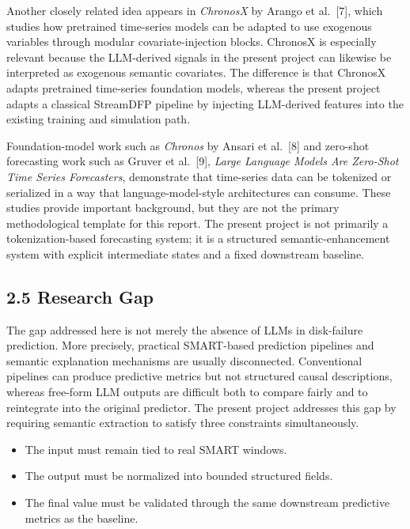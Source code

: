 \documentclass[
  11pt,
  a4paper]{article}
\providecommand{\tightlist}{%
  \setlength{\itemsep}{0pt}\setlength{\parskip}{0pt}}
\begin{document}
Another closely related idea appears in \emph{ChronosX} by Arango et
al.~{[}7{]}, which studies how pretrained time-series models can be
adapted to use exogenous variables through modular covariate-injection
blocks. ChronosX is especially relevant because the LLM-derived signals
in the present project can likewise be interpreted as exogenous semantic
covariates. The difference is that ChronosX adapts pretrained
time-series foundation models, whereas the present project adapts a
classical StreamDFP pipeline by injecting LLM-derived features into the
existing training and simulation path.

Foundation-model work such as \emph{Chronos} by Ansari et al.~{[}8{]}
and zero-shot forecasting work such as Gruver et al.~{[}9{]},
\emph{Large Language Models Are Zero-Shot Time Series Forecasters},
demonstrate that time-series data can be tokenized or serialized in a
way that language-model-style architectures can consume. These studies
provide important background, but they are not the primary
methodological template for this report. The present project is not
primarily a tokenization-based forecasting system; it is a structured
semantic-enhancement system with explicit intermediate states and a
fixed downstream baseline.

\hypertarget{research-gap}{%
\subsection{2.5 Research Gap}\label{research-gap}}

The gap addressed here is not merely the absence of LLMs in disk-failure
prediction. More precisely, practical SMART-based prediction pipelines
and semantic explanation mechanisms are usually disconnected.
Conventional pipelines can produce predictive metrics but not structured
causal descriptions, whereas free-form LLM outputs are difficult both to
compare fairly and to reintegrate into the original predictor. The
present project addresses this gap by requiring semantic extraction to
satisfy three constraints simultaneously.

\begin{itemize}
\tightlist
\item
  The input must remain tied to real SMART windows.
\item
  The output must be normalized into bounded structured fields.
\item
  The final value must be validated through the same downstream
  predictive metrics as the baseline.
\end{itemize}
\end{document}

